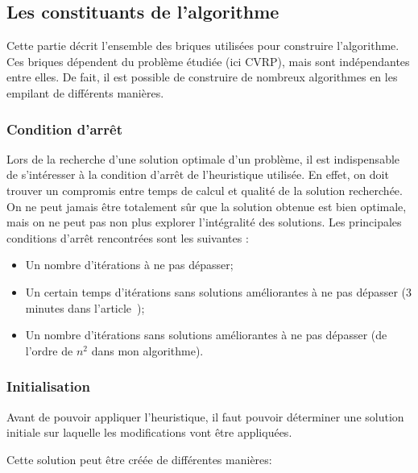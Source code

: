 \documentclass[a4paper,11pt]{article}%
\begin{document}
\subsection{Les constituants de l'algorithme}
Cette partie décrit l'ensemble des briques utilisées pour construire l'algorithme. Ces briques dépendent du problème étudiée (ici CVRP), mais sont indépendantes entre elles. De fait, il est possible de construire de nombreux algorithmes en les empilant de différents manières.

\subsubsection{Condition d'arrêt}

Lors de la recherche d'une solution optimale d'un problème, il est indispensable de s'intéresser à la condition d'arrêt de l'heuristique utilisée. En effet, on doit trouver un compromis entre temps de calcul et qualité de la solution recherchée. On ne peut jamais être totalement sûr que la solution obtenue est bien optimale, mais on ne peut pas non plus explorer l'intégralité des solutions. Les principales conditions d'arrêt rencontrées sont les suivantes :
\begin{itemize}
\item Un nombre d'itérations à ne pas dépasser;
\item Un certain temps d'itérations sans solutions améliorantes à ne pas dépasser (3 minutes dans l'article~\cite{Sorensen_2017});
\item Un nombre d'itérations sans solutions améliorantes à ne pas dépasser (de l'ordre de $n^2$ dans mon algorithme). 
\end{itemize}

\subsubsection{Initialisation}
Avant de pouvoir appliquer l'heuristique, il faut pouvoir déterminer une solution initiale sur laquelle les modifications vont être appliquées. 

Cette solution peut être créée de différentes manières:
\end{document}
